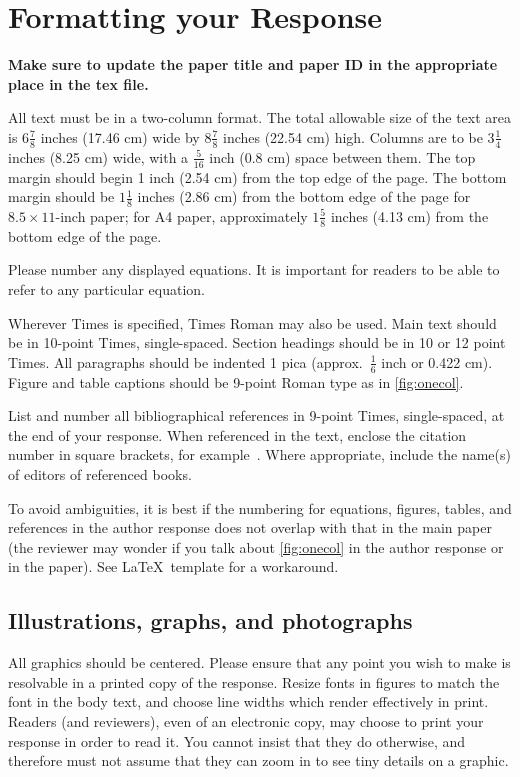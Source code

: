 \documentclass[10pt,twocolumn,letterpaper]{article}
\begin{document}
\section{Formatting your Response}

{\bf Make sure to update the paper title and paper ID in the appropriate place in the tex file.}

All text must be in a two-column format.
The total allowable size of the text area is $6\frac78$ inches (17.46 cm) wide by $8\frac78$ inches (22.54 cm) high.
Columns are to be $3\frac14$ inches (8.25 cm) wide, with a $\frac{5}{16}$ inch (0.8 cm) space between them.
The top margin should begin 1 inch (2.54 cm) from the top edge of the page.
The bottom margin should be $1\frac{1}{8}$ inches (2.86 cm) from the bottom edge of the page for $8.5 \times 11$-inch paper;
for A4 paper, approximately $1\frac{5}{8}$ inches (4.13 cm) from the bottom edge of the page.

Please number any displayed equations.
It is important for readers to be able to refer to any particular equation.

Wherever Times is specified, Times Roman may also be used.
Main text should be in 10-point Times, single-spaced.
Section headings should be in 10 or 12 point Times.
All paragraphs should be indented 1 pica (approx.~$\frac{1}{6}$ inch or 0.422 cm).
Figure and table captions should be 9-point Roman type as in \cref{fig:onecol}.


List and number all bibliographical references in 9-point Times, single-spaced,
at the end of your response.
When referenced in the text, enclose the citation number in square brackets, for example~\cite{Alpher05}.
Where appropriate, include the name(s) of editors of referenced books.

To avoid ambiguities, it is best if the numbering for equations, figures, tables, and references in the author response does not overlap with that in the main paper (the reviewer may wonder if you talk about \cref{fig:onecol} in the author response or in the paper).
See \LaTeX\ template for a workaround.

\subsection{Illustrations, graphs, and photographs}

All graphics should be centered.
Please ensure that any point you wish to make is resolvable in a printed copy of the response.
Resize fonts in figures to match the font in the body text, and choose line widths which render effectively in print.
Readers (and reviewers), even of an electronic copy, may choose to print your response in order to read it.
You cannot insist that they do otherwise, and therefore must not assume that they can zoom in to see tiny details on a graphic.
\end{document}
